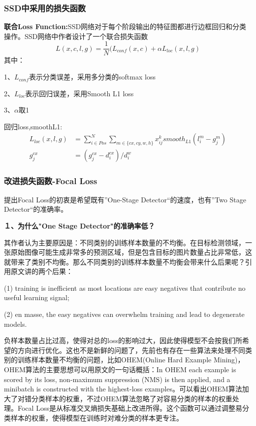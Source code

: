 \subsubsection{SSD中采用的损失函数}
\textbf{联合Loss Function:}SSD网络对于每个阶段输出的特征图都进行边框回归和分类操作。SSD网络中作者设计了一个联合损失函数
\begin{equation}
	L(x,c,l,g) = \frac{1}{N}(L_{conf}(x,c) + \alpha L_{loc}(x,l,g)
\end{equation}
其中：

 1、$L_{conf}$表示分类误差，采用多分类的softmax loss
 
 2、$L_{loc}$表示回归误差，采用Smooth L1 loss
 
 3、$\alpha$取1
 
回归loss,smoothL1:
\begin{align}
	L_{loc}(x,l,g) &= \sum _{i \in Pos} ^{N} \sum_{m \in \{cx,cy,w,h\}} x_{ij}^k smooth _{L1} (l_i ^m - g_j ^m) \\
	g_j^{cx} &= \left( g_j ^{cx} - d_i ^{cx} \right) / d_i ^w 
\end{align}	

\subsubsection{改进损失函数-Focal Loss}
提出Focal Loss的初衷是希望既有”One-Stage Detector“的速度，也有”Two Stage Detector“的准确率。

\textbf{１、为什么"One Stage Detector"的准确率低？}

其作者认为主要原因是：不同类别的训练样本数量的不均衡。在目标检测领域，一张原始图像可能生成非常多的预测区域，但是包含目标的图片数量占比非常低，这就带来了类别不均衡。那么不同类别的训练样本数量不均衡会带来什么后果呢？引用原文讲的两个后果：

(1) training is inefficient as most locations are easy negatives that contribute no useful learning signal; 

(2) en masse, the easy negatives can overwhelm training and lead to degenerate models. \cite{focal-loss}

负样本数量占比过高，使得对总的loss的影响过大，因此使得模型不会按我们所希望的方向进行优化。这也不是新鲜的问题了，先前也有存在一些算法来处理不同类别的训练样本数量不均衡的问题，比如OHEM(Online Hard Example Mining)\cite{ohem}，OHEM算法的主要思想可以用原文的一句话概括：In OHEM each example is scored by its loss, non-maximum suppression (NMS\cite{soft-nms}) is then applied, and a minibatch is constructed with the highest-loss examples。\cite{ohem}可以看出OHEM算法加大了对错分类样本的权重，不过OHEM算法忽略了对容易分类的样本的权重处理。Focal Loss是从标准交叉熵损失基础上改进所得。这个函数可以通过调整易分类样本的权重，使得模型在训练时对难分类的样本更专注。

